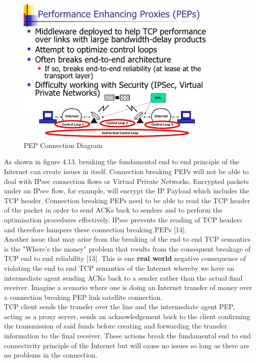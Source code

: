 \documentclass{uathesis}
\begin{document}
\begin{figure}[h!]
    \centering
    \includegraphics[width=0.87\textwidth]{PEP1.PNG}
    \caption{PEP Connection Diagram}
    \label{fig:PEP3}
\end{figure}

As shown in figure 4.13, breaking the fundamental end to end principle of the Internet can create issues in itself. Connection breaking PEPs will not be able to deal with IPsec connection flows or Virtual Private Networks. Encrypted packets under an IPsec flow, for example, will encrypt the IP Payload which includes the TCP header. Connection breaking PEPs need to be able to read the TCP header of the packet in order to send ACKs back to senders and to perform the optimisation procedures effectively. IPsec prevents the reading of TCP headers and therefore hampers these connection breaking PEPs [14].\\ 

Another issue that may arise from the breaking of the end to end TCP semantics is the "Where's the money" problem that results from the consequent breakage of TCP end to end reliability [13]. This is one \textbf{real world} negative consequence of violating the end to end TCP semantics of the Internet whereby we have an intermediate agent sending ACKs back to a sender rather than the actual final receiver. Imagine a scenario where one is doing an Internet transfer of money over a connection breaking PEP link satellite connection. \\

TCP client sends the transfer over the line and the intermediate agent PEP, acting as a proxy server, sends an acknowledgement back to the client confirming the transmission of said funds before creating and forwarding the transfer information to the final receiver. These actions break the fundamental end to end connectivity principle of the Internet but will cause no issues so long as there are no problems in the connection. \\
\end{document}
